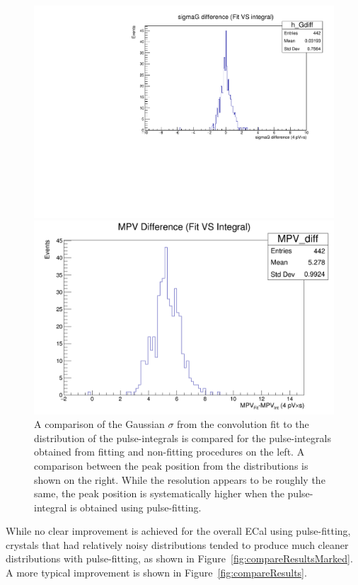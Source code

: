 \documentclass[twoside]{article}
\begin{document}
\begin{figure}[hbt]
\begin{minipage}{0.5\textwidth}
 \includegraphics[width=\textwidth]{pics/cosmicGdiff.pdf}
\end{minipage}\hfill\begin{minipage}{0.5\textwidth}
 \includegraphics[width=\textwidth]{pics/cosmicMPVdiff.png}
 \end{minipage}
  \caption{A comparison of the Gaussian $\sigma$ from the convolution fit to the distribution of the pulse-integrals is compared for the pulse-integrals obtained from fitting and non-fitting procedures on the left. A comparison between the peak position from the distributions is shown on the right. While the resolution appears to be roughly the same, the peak position is systematically higher when the pulse-integral is obtained using pulse-fitting.}
  \label{fig:compare}
\end{figure}
While no clear improvement is achieved for the overall ECal using pulse-fitting, crystals that had relatively noisy distributions tended to produce much cleaner distributions with pulse-fitting, as shown in Figure~\ref{fig:compareResultsMarked}. A more typical improvement is shown in Figure~\ref{fig:compareResults}.\\
\end{document}
